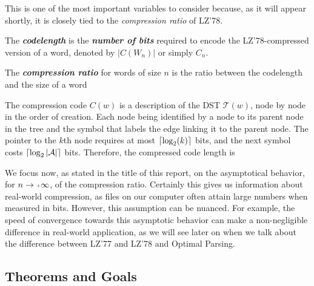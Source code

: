 \begin{rmk}
    \label{rmk:numberphrases}
    This is one of the most important variables to consider because,
    as it will appear shortly, it is closely tied to the \emph{compression 
    ratio} of LZ'78.
\end{rmk}

\begin{df}
    \label{df:codelength}
    The \emph{\bfseries codelength} is the \emph{\bfseries number of bits} required 
    to encode the LZ'78-compressed version of a word, denoted by $|C(W_n)|$ or 
    simply $C_n$.
\end{df}

\begin{df}
    \label{df:compratio}
    The \emph{\bfseries compression ratio} for words of size $n$ is the ratio between the 
    codelength and the size of a word
\end{df}

\begin{prop}
    The compression code $C(w)$ is a description of the DST $\mathcal{T}(w)$,
    node by node in the order of creation. Each node being identified by a node 
    to its parent node in the tree and the symbol that labels the edge linking it to the
    parent node. The pointer to the $k$th node requires at most $\lceil\log_2(k)\rceil$ bits,
    and the next symbol costs $\lceil\log_2 |\mathcal{A}|\rceil$ bits. Therefore, the 
    compressed code length is 
\end{prop}




    \noindent
    We focus now, as stated in the title of this report, on the asymptotical behavior,
    for $n \rightarrow \pinf$, of the compression ratio. Certainly this gives us 
    information about real-world compression, as files on our computer often attain
    large numbers when measured in bits. However, this assumption can be nuanced.
    For example, the speed of convergence towards this asymptotic behavior can make 
    a non-negligible difference in real-world application, as we will see later on
    when we talk about the difference between LZ'77 and LZ'78 and Optimal Parsing.


\subsection{Theorems and Goals }


